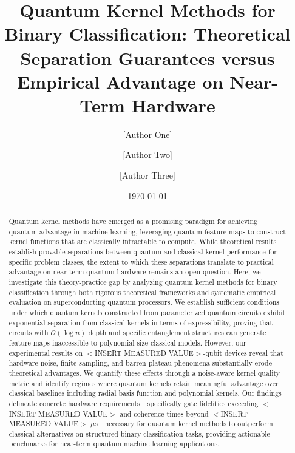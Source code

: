 \documentclass[aps,prb,reprint,superscriptaddress,showpacs]{revtex4-2}
\begin{document}
\title{Quantum Kernel Methods for Binary Classification: Theoretical Separation Guarantees versus Empirical Advantage on Near-Term Hardware}

\author{[Author One]}

\author{[Author Two]}

\author{[Author Three]}

\date{\today}

\begin{abstract}
Quantum kernel methods have emerged as a promising paradigm for achieving quantum advantage in machine learning, leveraging quantum feature maps to construct kernel functions that are classically intractable to compute. While theoretical results establish provable separations between quantum and classical kernel performance for specific problem classes, the extent to which these separations translate to practical advantage on near-term quantum hardware remains an open question. Here, we investigate this theory-practice gap by analyzing quantum kernel methods for binary classification through both rigorous theoretical frameworks and systematic empirical evaluation on superconducting quantum processors. We establish sufficient conditions under which quantum kernels constructed from parameterized quantum circuits exhibit exponential separation from classical kernels in terms of expressibility, proving that circuits with $\mathcal{O}(\log n)$ depth and specific entanglement structures can generate feature maps inaccessible to polynomial-size classical models. However, our experimental results on $<$INSERT MEASURED VALUE$>$-qubit devices reveal that hardware noise, finite sampling, and barren plateau phenomena substantially erode theoretical advantages. We quantify these effects through a noise-aware kernel quality metric and identify regimes where quantum kernels retain meaningful advantage over classical baselines including radial basis function and polynomial kernels. Our findings delineate concrete hardware requirements---specifically gate fidelities exceeding $<$INSERT MEASURED VALUE$>$ and coherence times beyond $<$INSERT MEASURED VALUE$>$ $\mu$s---necessary for quantum kernel methods to outperform classical alternatives on structured binary classification tasks, providing actionable benchmarks for near-term quantum machine learning applications.
\end{abstract}
\end{document}
